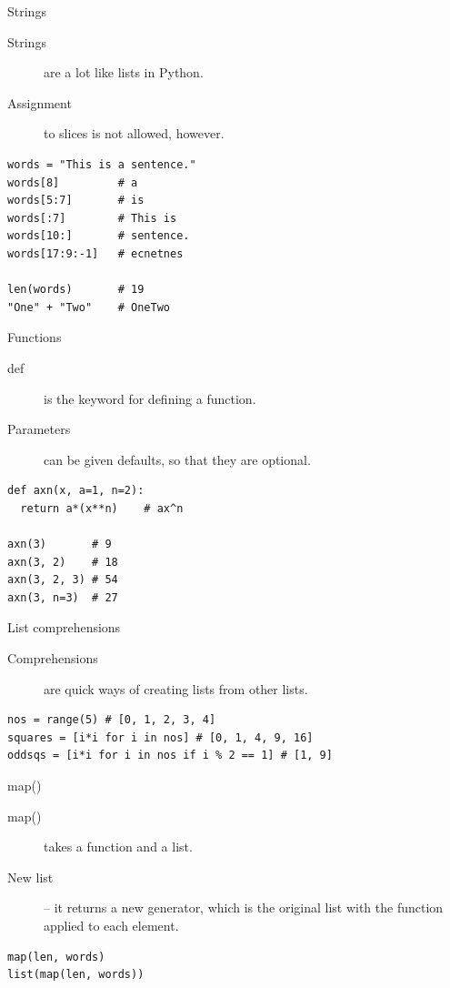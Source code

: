 \begin{frame}[fragile]{Strings}
  \begin{description}
    \item[Strings] are a lot like lists in Python.
    \item[Assignment] to slices is not allowed, however.
  \end{description}
  \begin{verbatim}
words = "This is a sentence."
words[8]         # a
words[5:7]       # is
words[:7]        # This is
words[10:]       # sentence.
words[17:9:-1]   # ecnetnes

len(words)       # 19
"One" + "Two"    # OneTwo
  \end{verbatim}
\end{frame}

\begin{frame}[fragile]{Functions}
  \begin{description}
    \item[def] is the keyword for defining a function.
    \item[Parameters] can be given defaults, so that they are optional.
  \end{description}
  \begin{verbatim}
def axn(x, a=1, n=2):
  return a*(x**n)    # ax^n
 
axn(3)       # 9
axn(3, 2)    # 18
axn(3, 2, 3) # 54
axn(3, n=3)  # 27
  \end{verbatim}
\end{frame}

\begin{frame}[fragile]{List comprehensions}
  \begin{description}
    \item[Comprehensions] are quick ways of creating lists from other lists.
  \end{description}
  \begin{verbatim}
nos = range(5) # [0, 1, 2, 3, 4]
squares = [i*i for i in nos] # [0, 1, 4, 9, 16]
oddsqs = [i*i for i in nos if i % 2 == 1] # [1, 9]
  \end{verbatim}
\end{frame}



\begin{frame}[fragile]{map()}
  \begin{description}
    \item[map()] takes a function and a list.
    \item[New list] -- it returns a new generator, which is the original list with the function applied to each element.
  \end{description}
  \begin{verbatim}
map(len, words)
list(map(len, words))
  \end{verbatim}
\end{frame}


